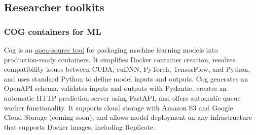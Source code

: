 \subsection{Researcher toolkits}
\subsubsection{COG containers for ML}
Cog is an \href{https://github.com/replicate/cog}{open-source tool} for packaging machine learning models into production-ready containers. It simplifies Docker container creation, resolves compatibility issues between CUDA, cuDNN, PyTorch, TensorFlow, and Python, and uses standard Python to define model inputs and outputs. Cog generates an OpenAPI schema, validates inputs and outputs with Pydantic, creates an automatic HTTP prediction server using FastAPI, and offers automatic queue worker functionality. It supports cloud storage with Amazon S3 and Google Cloud Storage (coming soon), and allows model deployment on any infrastructure that supports Docker images, including Replicate.
